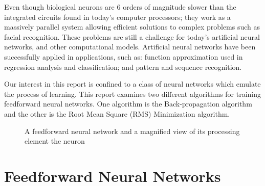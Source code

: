 \documentclass[11pt]{article}
\begin{document}
Even though biological neurons are 6 orders of magnitude slower than the integrated circuits found in today's computer processors; they
work as a massively parallel system allowing efficient solutions to complex problems such as facial recognition. These problems are
still a challenge for today's artificial neural networks, and other computational models. Artificial neural networks have been
successfully applied in applications, such as: function approximation used in regression analysis and classification; and pattern and
sequence recognition.

Our interest in this report is confined to a class of neural networks which emulate the process of learning. This report examines two
different algorithms for training feedforward neural networks. One algorithm is the Back-propagation algorithm and the other is the Root
Mean Square (RMS) Minimization algorithm.

\begin{figure}[]
	\centering
		\hspace{2mm} 
		\caption{A feedforward neural network and a magnified view of its processing element the neuron}
	\label{fig:figures_ffwdnn_Neuron}	
\end{figure}

\section{Feedforward Neural Networks} %
\label{sec:feedforward_neural_networks}
\end{document}
